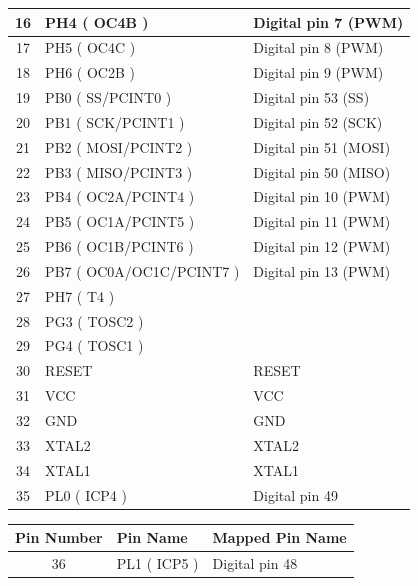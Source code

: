 \begin{appendix}
\begin{table}[h]
\begin{tabular}{|c|p{15.855em}|p{11.43em}|}
    16    & PH4 ( OC4B ) & Digital pin 7 (PWM) \\
    \hline
    17    & PH5 ( OC4C ) & Digital pin 8 (PWM) \\
    \hline
    18    & PH6 ( OC2B ) & Digital pin 9 (PWM) \\
    \hline
    19    & PB0 ( SS/PCINT0 ) & Digital pin 53 (SS) \\
    \hline
    20    & PB1 ( SCK/PCINT1 ) & Digital pin 52 (SCK) \\
    \hline
    21    & PB2 ( MOSI/PCINT2 ) & Digital pin 51 (MOSI) \\
    \hline
    22    & PB3 ( MISO/PCINT3 ) & Digital pin 50 (MISO) \\
    \hline
    23    & PB4 ( OC2A/PCINT4 ) & Digital pin 10 (PWM) \\
    \hline
    24    & PB5 ( OC1A/PCINT5 ) & Digital pin 11 (PWM) \\
    \hline
    25    & PB6 ( OC1B/PCINT6 ) & Digital pin 12 (PWM) \\
    \hline
    26    & PB7 ( OC0A/OC1C/PCINT7 ) & Digital pin 13 (PWM) \\
    \hline
    27    & PH7 ( T4 ) & \multicolumn{1}{l|}{} \\
    \hline
    28    & PG3 ( TOSC2 ) & \multicolumn{1}{l|}{} \\
    \hline
    29    & PG4 ( TOSC1 ) & \multicolumn{1}{l|}{} \\
    \hline
    30    & RESET & RESET \\
    \hline
    31    & VCC   & VCC \\
    \hline
    32    & GND   & GND \\
    \hline
    33    & XTAL2 & XTAL2 \\
    \hline
    34    & XTAL1 & XTAL1 \\
    \hline
    35    & PL0 ( ICP4 ) & Digital pin 49 \\
    \hline
    \end{tabular}%
  \label{tab:ATmega2560-Arduino Pin Mapping Tabelle}%
\end{table}%
\newpage
\begin{table}[h]
  \centering
    \begin{tabular}{|c|p{15.855em}|p{11.43em}|}
    \hline
    \multicolumn{1}{|p{7.07em}|}{\textbf{Pin Number}} & \textbf{Pin Name} & \textbf{Mapped Pin Name} \\
    \hline
    36    & PL1 ( ICP5 ) & Digital pin 48 \\

\end{tabular}
\end{table}
\end{appendix}
